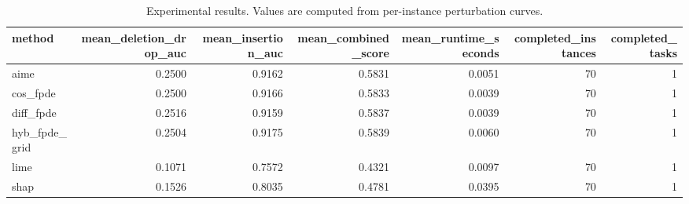 \begin{table}[t]
\caption{Experimental results. Values are computed from per-instance perturbation curves.}
\label{tab:main_results_computed}
\centering
\begin{tabular}{lrrrrrr}
\toprule
method & mean\_deletion\_drop\_auc & mean\_insertion\_auc & mean\_combined\_score & mean\_runtime\_seconds & completed\_instances & completed\_tasks \\
\midrule
aime & 0.2500 & 0.9162 & 0.5831 & 0.0051 & 70 & 1 \\
cos\_fpde & 0.2500 & 0.9166 & 0.5833 & 0.0039 & 70 & 1 \\
diff\_fpde & 0.2516 & 0.9159 & 0.5837 & 0.0039 & 70 & 1 \\
hyb\_fpde\_grid & 0.2504 & 0.9175 & 0.5839 & 0.0060 & 70 & 1 \\
lime & 0.1071 & 0.7572 & 0.4321 & 0.0097 & 70 & 1 \\
shap & 0.1526 & 0.8035 & 0.4781 & 0.0395 & 70 & 1 \\
\bottomrule
\end{tabular}

\end{table}
